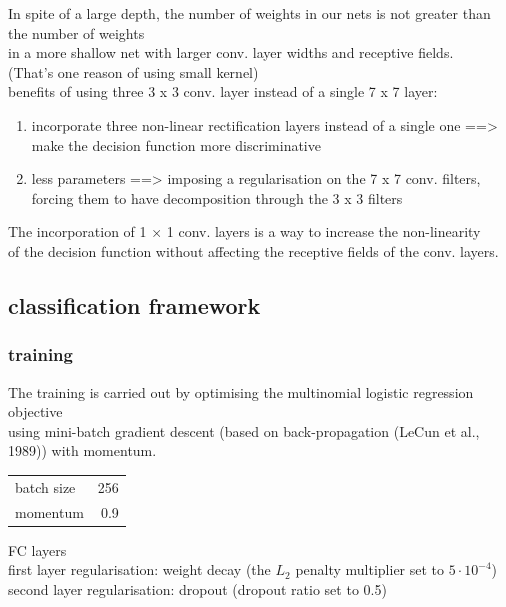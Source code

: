 \documentclass[11pt]{article}
\begin{document}
In spite of a large depth, the number of weights in our nets is not greater than the number of weights \\
in a more shallow net with larger conv. layer widths and receptive fields. \\
(That's one reason of using small kernel) \\


benefits of using three 3 x 3 conv. layer instead of a single 7 x 7 layer: \\
\begin{enumerate}
\item incorporate three non-linear rectification layers instead of a single one ==> make the decision function more discriminative \\
\item less parameters ==> imposing a regularisation on the 7 x 7 conv. filters, forcing them to have decomposition through the 3 x 3 filters \\
\end{enumerate}


The incorporation of 1 × 1 conv. layers is a way to increase the non-linearity \\
of the decision function without affecting the receptive fields of the conv. layers. \\

\subsection{classification framework}
\label{sec-2-4}

\subsubsection{training}
\label{sec-2-4-1}
The training is carried out by optimising the multinomial logistic regression objective \\
using mini-batch gradient descent (based on back-propagation (LeCun et al., 1989)) with momentum. \\

\begin{center}
\begin{tabular}{lr}
batch size & 256\\
momentum & 0.9\\
\end{tabular}
\end{center}

FC layers \\
first layer regularisation: weight decay (the $L_2$ penalty multiplier set to $5\cdot 10^{-4}$) \\
second layer regularisation: dropout (dropout ratio set to 0.5) \\
\end{document}
